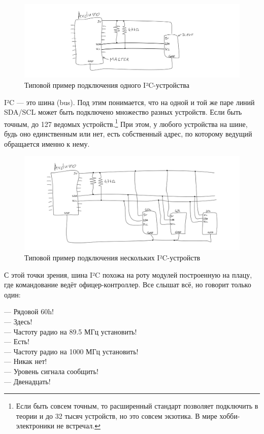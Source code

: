 \begin{figure}
  \centering
  \includegraphics{sketches/i2c-single}
  \caption{Типовой пример подключения одного I²C-устройства}
\end{figure}

I²C — это шина (bus). Под этим понимается, что на одной и той же паре линий SDA/SCL может быть подключено множество разных устройств. Если быть точным, до 127 ведомых устройств.\footnote{Если быть совсем точным, то расширенный стандарт позволяет подключить в теории и до 32 тысяч устройств, но это совсем экзотика. В мире хобби-электроники не встречал.} При этом, у любого устройства на шине, будь оно единственным или нет, есть собственный адрес, по которому ведущий обращается именно к нему.

\begin{figure}
  \centering
  \includegraphics{sketches/i2c-multiple}
  \caption{Типовой пример подключения нескольких I²C-устройств}
\end{figure}

С этой точки зрения, шина I²C похожа на роту модулей построенную на плацу, где командование ведёт офицер-контроллер. Все слышат всё, но говорит только один:

— Рядовой 60h!\\
— Здесь!\\
— Частоту радио на 89.5 МГц установить!\\
— Есть!\\
— Частоту радио на 1000 МГц установить!\\
— Никак нет!\\
— Уровень сигнала сообщить!\\
— Двенадцать!

